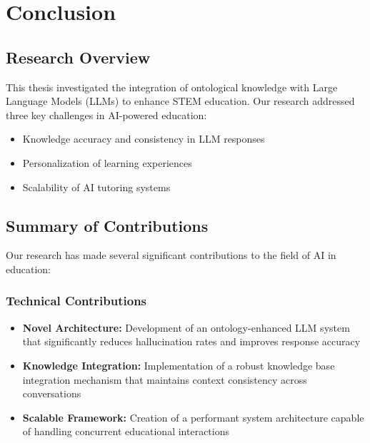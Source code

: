 \chapter{Conclusion}
\label{chap:conclusion}

\section{Research Overview}
\label{sec:research-overview}

This thesis investigated the integration of ontological knowledge with Large Language Models (LLMs) to enhance STEM education. Our research addressed three key challenges in AI-powered education:

\begin{itemize}
    \item Knowledge accuracy and consistency in LLM responses
    \item Personalization of learning experiences
    \item Scalability of AI tutoring systems
\end{itemize}

\section{Summary of Contributions}
\label{sec:contributions}

Our research has made several significant contributions to the field of AI in education:

\subsection{Technical Contributions}
\begin{itemize}
    \item \textbf{Novel Architecture:} Development of an ontology-enhanced LLM system that significantly reduces hallucination rates and improves response accuracy~\cite{liu2024ontology}
    \item \textbf{Knowledge Integration:} Implementation of a robust knowledge base integration mechanism that maintains context consistency across conversations~\cite{funk2023neuro}
    \item \textbf{Scalable Framework:} Creation of a performant system architecture capable of handling concurrent educational interactions~\cite{wang2024adaptive}
\end{itemize}

